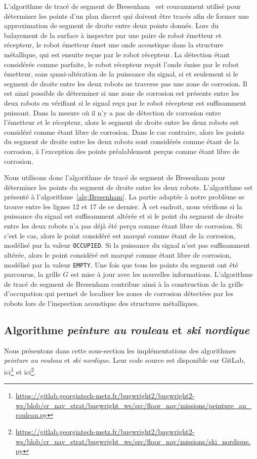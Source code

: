 \documentclass[francais,RandD]{rapportPFE}
\begin{document}
			L'algorithme de tracé de segment de Bresenham~\cite{enwiki:1155124335} est couramment utilisé pour déterminer les points d'un plan discret qui doivent être tracés afin de former une approximation de segment de droite entre deux points donnés.
			Lors du balayement de la surface à inspecter par une paire de robot émetteur et récepteur, le robot émetteur émet une onde acoustique dans la structure métallique, qui est ensuite reçue par le robot récepteur.
			La détection étant considérée comme parfaite, le robot récepteur reçoit l'onde émise par le robot émetteur, sans quasi-altération de la puissance du signal, si et seulement si le segment de droite entre les deux robots ne traverse pas une zone de corrosion.
			Il est ainsi possible de déterminer si une zone de corrosion est présente entre les deux robots en vérifiant si le signal reçu par le robot récepteur est suffisamment puissant.
			Dans la mesure où il n'y a pas de détection de corrosion entre l'émetteur et le récepteur, alors le segment de droite entre les deux robots est considéré comme étant libre de corrosion.
			Dans le cas contraire, alors les points du segment de droite entre les deux robots sont considérés comme étant de la corrosion, à l'exception des points préalablement perçus comme étant libre de corrosion.


			Nous utilisons donc l'algorithme de tracé de segment de Bresenham pour déterminer les points du segment de droite entre les deux robots.
			L'algorithme est présenté à l'algorithme~\ref{alg:Bresenham}. La partie adaptée à notre problème se trouve entre les lignes 12 et 17 de ce dernier.
			À cet endroit, nous vérifions si la puissance du signal est suffisamment altérée et si le point du segment de droite entre les deux robots n'a pas déjà été perçu comme étant libre de corrosion.
			Si c'est le cas, alors le point considéré est marqué comme étant de la corrosion, modélisé par la valeur \texttt{OCCUPIED}.
			Si la puissance du signal n'est pas suffisamment altérée, alors le point considéré est marqué comme étant libre de corrosion, modélisé par la valeur \texttt{EMPTY}.
			Une fois que tous les points du segment ont été parcourus, la grille $G$ est mise à jour avec les nouvelles informations.
			L'algorithme de tracé de segment de Bresenham contribue ainsi à la construction de la grille d'occupation qui permet de localiser les zones de corrosion détectées par les robots lors de l'inspection acoustique des structures métalliques.
		\subsection*{Algorithme \textit{peinture au rouleau} et \textit{ski nordique}}
			Nous présentons dans cette sous-section les implémentations des algorithmes \textit{peinture au rouleau} et \textit{ski nordique}.
			Leur code source est disponible sur GitLab, ici\footnote{\url{https://gitlab.georgiatech-metz.fr/bugwright2/bugwright2-ws/blob/cr_nav_strat/bugwright_ws/src/floor_nav/missions/peinture_au_rouleau.py}} et ici\footnote{\url{https://gitlab.georgiatech-metz.fr/bugwright2/bugwright2-ws/blob/cr_nav_strat/bugwright_ws/src/floor_nav/missions/ski_nordique.py}}.
\end{document}
